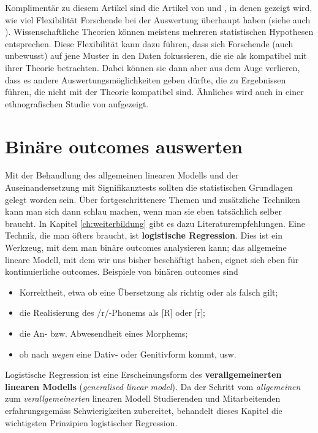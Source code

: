 \documentclass[oneside, 10pt]{book}\usepackage[]{graphicx}\usepackage[]{xcolor}
\begin{document}
Komplimentär zu diesem Artikel sind die Artikel
von \citet{Gelman2013} und \citet{Steegen2016},
in denen gezeigt wird, wie viel Flexibilität
Forschende bei der Auswertung überhaupt haben
(siehe auch \citealp{Poarch2018}). Wissenschaftliche
Theorien können meistens mehreren statistischen Hypothesen
entsprechen. Diese Flexibilität kann dazu
führen, dass sich Forschende (auch unbewusst) auf jene
Muster in den Daten fokussieren, die sie als kompatibel
mit ihrer Theorie betrachten. Dabei können sie dann
aber aus dem Auge verlieren, dass es andere
Auswertungsmöglichkeiten geben dürfte, die zu
Ergebnissen führen, die nicht mit der Theorie kompatibel
sind. Ähnliches wird auch in einer ethnografischen
Studie von \citet{Peterson2016} aufgezeigt.


\chapter{Binäre outcomes auswerten}\label{ch:logistic}
Mit der Behandlung des allgemeinen linearen Modells und
der Auseinandersetzung mit Signifikanztests sollten
die statistischen Grundlagen gelegt worden sein.
Über fortgeschrittenere Themen und zusätzliche Techniken kann
man sich dann schlau machen, wenn man sie eben tatsächlich selber
braucht. In Kapitel \ref{ch:weiterbildung} gibt es dazu Literaturempfehlungen.
Eine Technik, die man öfters braucht, ist \textbf{logistische Regression}.
Dies ist ein Werkzeug, mit dem man binäre outcomes analysieren
kann; das allgemeine lineare Modell, mit dem wir uns bisher beschäftigt haben,
eignet sich eben für kontinuierliche outcomes.
Beispiele von binären outcomes sind
\begin{itemize}
  \item Korrektheit, etwa ob eine Übersetzung als richtig oder als falsch gilt;
  \item die Realisierung des /r/-Phonems als [R] oder [r];
  \item die An- bzw. Abwesendheit eines Morphems;
  \item ob nach \textit{wegen} eine Dativ- oder Genitivform kommt, usw.
\end{itemize}

Logistische Regression ist eine Erscheinungsform des 
\textbf{verallgemeinerten linearen Modells}
(\textit{generalised linear model}). Da der Schritt vom \emph{allgemeinen}
zum \emph{verallgemeinerten} linearen Modell Studierenden und Mitarbeitenden
erfahrungsgemäss Schwierigkeiten zubereitet, 
behandelt dieses Kapitel die wichtigsten Prinzipien
logistischer Regression.
\end{document}
